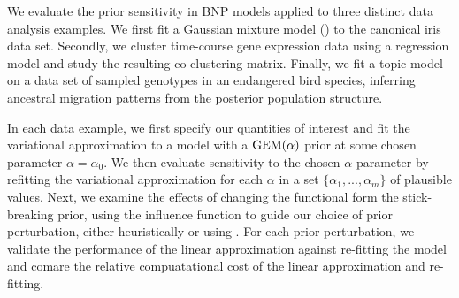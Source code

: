 We evaluate the prior sensitivity in BNP models applied to three distinct data
analysis examples. We first fit a Gaussian mixture model
() to the canonical iris data set. Secondly, we cluster
time-course gene expression data using a regression model and study the
resulting co-clustering matrix. Finally, we fit a topic model on a data set of
sampled genotypes in an endangered bird species, inferring  ancestral migration
patterns from the posterior population structure.

In each data example, we first specify our quantities of interest and fit the
variational approximation to a model with a $\mathrm{GEM}(\alpha)$ prior at some chosen
parameter $\alpha = \alpha_0$. We then evaluate sensitivity to the chosen
$\alpha$ parameter by refitting the variational approximation for each $\alpha$
in a set $\{\alpha_1, ..., \alpha_m\}$ of plausible values. Next, we examine the
effects of changing the functional form the stick-breaking prior, using the
influence function to guide our choice of prior perturbation, either
heuristically or using . For each prior perturbation,
we validate the performance of the linear approximation against re-fitting the
model and comare the relative compuatational cost of the linear approximation
and re-fitting.
